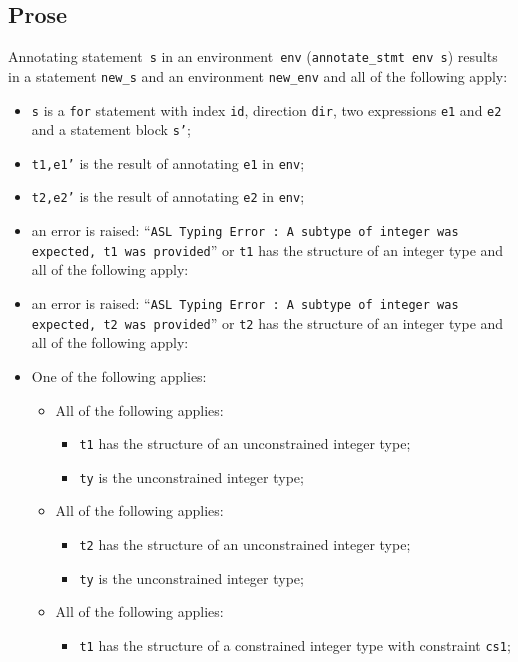 \documentclass{book}
\begin{document}
  \subsection{Prose}
Annotating statement~\texttt{s} in an environment~\texttt{env}
(\texttt{annotate\_stmt env s}) results in a statement \texttt{new\_s} and an
environment \texttt{new\_env} and all of the following apply:
   \begin{itemize}
   \item \texttt{s} is a \texttt{for} statement with index \texttt{id}, direction \texttt{dir}, two expressions
      \texttt{e1} and \texttt{e2} and a statement block \texttt{s'};
   \item \texttt{t1,e1'} is the result of annotating \texttt{e1} in \texttt{env};
   \item \texttt{t2,e2'} is the result of annotating \texttt{e2} in \texttt{env};
   \item an error is raised: ``\texttt{ASL Typing Error : A subtype of integer was expected, t1 was provided}'' or \texttt{t1} has the structure of an integer type and all of the following apply:
   \item an error is raised: ``\texttt{ASL Typing Error : A subtype of integer was expected, t2 was provided}'' or \texttt{t2} has the structure of an integer type and all of the following apply:
   \item One of the following applies:
     \begin{itemize}
       \item All of the following applies:
         \begin{itemize}
           \item \texttt{t1} has the structure of an unconstrained integer type;
           \item \texttt{ty} is the unconstrained integer type;
         \end{itemize}
       \item All of the following applies:
         \begin{itemize}
           \item \texttt{t2} has the structure of an unconstrained integer type;
           \item \texttt{ty} is the unconstrained integer type;
         \end{itemize}
       \item All of the following applies:
         \begin{itemize}
           \item \texttt{t1} has the structure of a constrained integer type with constraint \texttt{cs1};

\end{itemize}
\end{itemize}
\end{itemize}
\end{document}
